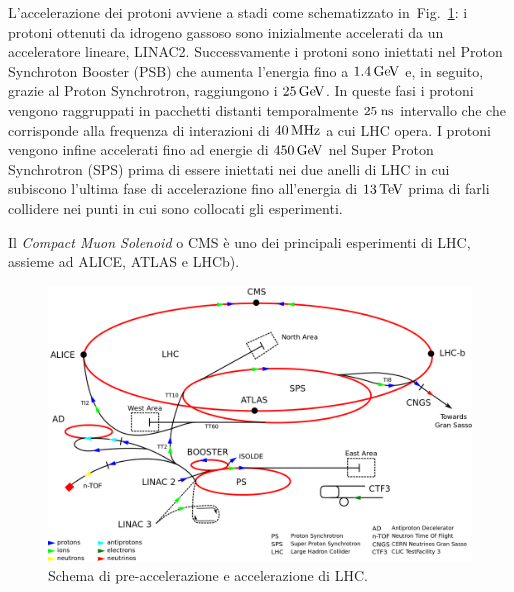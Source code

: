 L'accelerazione dei protoni avviene a stadi come schematizzato in~Fig.~\ref{fig:LHC}: i protoni ottenuti da idrogeno gassoso sono inizialmente accelerati da un acceleratore lineare, LINAC2. Successvamente i protoni sono iniettati nel Proton Synchroton Booster (PSB) che aumenta l'energia fino a $1.4{\rm \, Ge\kern-0.125em V}$ e, in seguito, grazie al Proton Synchrotron, raggiungono i $25{\rm \, Ge\kern-0.125em V}$. In queste fasi i protoni vengono raggruppati in pacchetti distanti temporalmente $25\rm \; ns$ intervallo che che corrisponde alla frequenza di interazioni di $40{\rm \, MHz}$ a cui LHC opera. 
I protoni vengono infine accelerati fino ad energie di $450{\rm \, Ge\kern-0.125em V}$ nel Super Proton Synchrotron (SPS) prima di essere iniettati nei due anelli di LHC in cui subiscono l'ultima fase di accelerazione fino all'energia di $13{\rm \, Te\kern-0.125em V}$ prima di farli collidere nei punti in cui sono collocati gli esperimenti.

Il {\em Compact Muon Solenoid} o CMS \cite{CMS} è uno dei principali esperimenti di LHC, assieme ad ALICE, ATLAS e LHCb)\cite{ALICE,ATLAS,LHCb}. 

\begin{figure}
\centering
\includegraphics[scale=0.25]{Immagini/LHC}
\caption{Schema di pre-accelerazione e accelerazione di LHC.}
\label{fig:LHC}
\end{figure}

